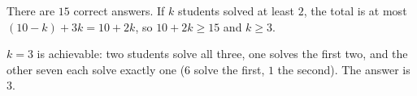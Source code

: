 There are $15$ correct answers. If $k$ students solved at least $2$, the total is at most $(10-k)+3k=10+2k$, so $10+2k\ge15$ and $k\ge3$.

$k=3$ is achievable: two students solve all three, one solves the first two, and the other seven each solve exactly one ($6$ solve the first, $1$ the second). The answer is $\boxed{3}$.

